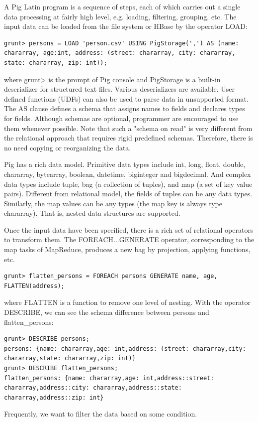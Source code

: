 \documentclass[11pt]{book}
\begin{document}
A Pig Latin program is a sequence of steps, each of which carries out a single data processing at fairly high level, e.g. loading, filtering, grouping, etc. The input data can be loaded from the file system or HBase by the operator LOAD:

\begin{lstlisting}
grunt> persons = LOAD 'person.csv' USING PigStorage(',') AS (name: chararray, age:int, address: (street: chararray, city: chararray, state: chararray, zip: int));
\end{lstlisting}
where grunt> is the prompt of Pig console and PigStorage is a built-in deserializer for structured text files. Various deserializers are available. User defined functions (UDFs) can also be used to parse data in unsupported format. The AS clause defines a schema that assigns names to fields and declares types for fields. Although schemas are optional, programmer are encouraged to use them whenever possible. Note that such a "schema on read" is very different from the relational approach that requires rigid predefined schemas. Therefore, there is no need copying or reorganizing the data.

Pig has a rich data model. Primitive data types include int, long, float, double, chararray, bytearray, boolean, datetime, biginteger and bigdecimal. And complex data types include tuple, bag (a collection of tuples), and map (a set of key value pairs). Different from relational model, the fields of tuples can be any data types. Similarly, the map values can be any types (the map key is always type chararray). That is, nested data structures are supported.

Once the input data have been specified, there is a rich set of relational operators to transform them. The FOREACH...GENERATE operator, corresponding to the map tasks of MapReduce, produces a new bag by projection, applying functions, etc.

\begin{lstlisting}
grunt> flatten_persons = FOREACH persons GENERATE name, age, FLATTEN(address);
\end{lstlisting}
where FLATTEN is a function to remove one level of nesting. With the operator DESCRIBE, we can see the schema difference between persons and flatten\_persons:

\begin{lstlisting}
grunt> DESCRIBE persons;
persons: {name: chararray,age: int,address: (street: chararray,city: chararray,state: chararray,zip: int)}
grunt> DESCRIBE flatten_persons;
flatten_persons: {name: chararray,age: int,address::street: chararray,address::city: chararray,address::state: chararray,address::zip: int}
\end{lstlisting}
Frequently, we want to filter the data based on some condition.
\end{document}

